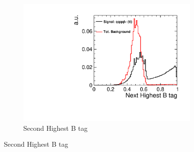 \begin{figure}[]\ContinuedFloat 
  \begin{subfigure}[b]{0.5\linewidth}
    \centering
    \includegraphics[width=0.75\linewidth]{TopAnalysis/figures/BDTVariables/NextHighestBTag.pdf} 
    \caption{Second Highest B tag} 
    \vspace{4ex}
  \end{subfigure}
\end{figure}

